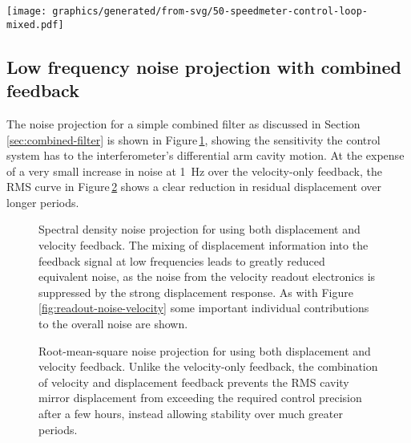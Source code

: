 \begin{sidewaysfigure}
  \texttt{[image: graphics/generated/from-svg/50-speedmeter-control-loop-mixed.pdf]}
  \caption[Modelled \SSMEXPT{} control loop using both displacement and velocity feedback]{\label{fig:ssm-control-loop-mixed}\SSMEXPT{} control loop model. This control loop is similar to that shown in Figure\,\ref{fig:ssm-control-loop-velocity}, but with the addition of components used to send the displacement-sensitive \gls{PDH} readout to \gls{CDS}. Within \gls{CDS}, additional gain blocks allow for control over the way in which the velocity and displacement readouts are combined into one feedback signal.}
\end{sidewaysfigure}

\subsection{Low frequency noise projection with combined feedback}
The \LMINUS{} noise projection for a simple combined filter as discussed in Section\,\ref{sec:combined-filter} is shown in Figure\,\ref{fig:readout-noise-mixed}, showing the sensitivity the control system has to the interferometer's differential arm cavity motion. At the expense of a very small increase in noise at \SI{1}{\hertz} over the velocity-only feedback, the \gls{RMS} curve in Figure\,\ref{fig:readout-noise-mixed-rms} shows a clear reduction in residual displacement over longer periods.

\begin{figure}
  \centering
  
  \caption[Spectral density noise projection for \LMINUS{} using both displacement and velocity feedback]{\label{fig:readout-noise-mixed}Spectral density noise projection for \LMINUS{} using both displacement and velocity feedback. The mixing of displacement information into the feedback signal at low frequencies leads to greatly reduced equivalent \LMINUS{} noise, as the noise from the velocity readout electronics is suppressed by the strong displacement response. As with Figure\,\ref{fig:readout-noise-velocity} some important individual contributions to the overall noise are shown.}
\end{figure}

\begin{figure}
  \centering
  
  \caption[Root-mean-square noise projection for \LMINUS{} using both displacement and velocity feedback]{\label{fig:readout-noise-mixed-rms}Root-mean-square noise projection for \LMINUS{} using both displacement and velocity feedback. Unlike the velocity-only feedback, the combination of velocity and displacement feedback prevents the \gls{RMS} cavity mirror displacement from exceeding the required control precision after a few hours, instead allowing stability over much greater periods.}
\end{figure}

